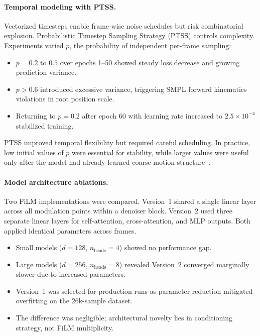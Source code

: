 \paragraph{Temporal modeling with PTSS.}
Vectorized timesteps enable frame-wise noise schedules but risk combinatorial explosion. Probabilistic Timestep Sampling Strategy (PTSS) controls complexity. Experiments varied $p$, the probability of independent per-frame sampling:
\begin{itemize}
    \item $p=0.2$ to $0.5$ over epochs 1–50 showed steady loss decrease and growing prediction variance.
    \item $p>0.6$ introduced excessive variance, triggering SMPL forward kinematics violations in root position scale.
    \item Returning to $p=0.2$ after epoch 60 with learning rate increased to $2.5 \times 10^{-4}$ stabilized training.
\end{itemize}
PTSS improved temporal flexibility but required careful scheduling. In practice, low initial values of $p$ were essential for stability, while larger values were useful only after the model had already learned coarse motion structure~\cite{ptss2024}.

\paragraph{Model architecture ablations.}
Two FiLM implementations were compared. Version~1 shared a single linear layer across all modulation points within a denoiser block. Version~2 used three separate linear layers for self-attention, cross-attention, and MLP outputs. Both applied identical parameters across frames.
\begin{itemize}
    \item Small models ($d=128$, $n_{\text{heads}}=4$) showed no performance gap.
    \item Large models ($d=256$, $n_{\text{heads}}=8$) revealed Version~2 converged marginally slower due to increased parameters.
    \item Version~1 was selected for production runs as parameter reduction mitigated overfitting on the 26k-sample dataset.
    \item The difference was negligible; architectural novelty lies in conditioning strategy, not FiLM multiplicity.
\end{itemize}

